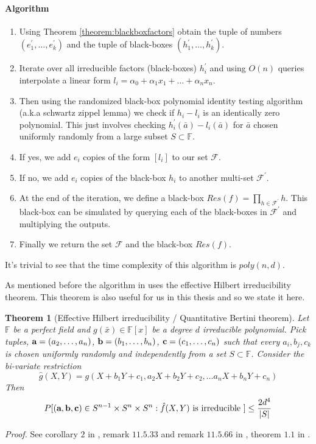 \documentclass[12pt]{caltech_thesis}
\theoremstyle{plain}
\newtheorem{theorem}{Theorem}
\theoremstyle{definition}
\renewcommand{\bf}{\textbf}
\newcommand{\F}{\mathbb{F}}
\newcommand{\MF}{\mathcal{F}}
\newcommand{\B}[1]{\bar{#1}}
\begin{document}
\paragraph{Algorithm} \label{algorithm:blackboxfactors}
\begin{enumerate}
 \item Using Theorem \ref{theorem:blackboxfactors} obtain the tuple of numbers $(e_1^\prime,\ldots,e_k^\prime)$ and the tuple of
 black-boxes $(h_1^\prime,\ldots , h_k^\prime)$.
 \item Iterate over all irreducible factors (black-boxes) $h_i^\prime$ and using $O(n)$ queries interpolate a linear form 
 $l_i = \alpha_0 + \alpha_1x_1 + \ldots + \alpha_n x_n$.
 \item Then using the randomized black-box polynomial identity testing algorithm (a.k.a schwartz zippel lemma) we check if
$h_i-l_i$ is an identically zero polynomial. This just involves checking $h_i^\prime(\B{a}) - l_i(\B{a})$ for $\B{a}$
chosen uniformly randomly from a large subset $S\subset \F$.
\item If yes, we add $e_i$ copies of the form $[l_i]$ to our set $\MF$.
\item  If no, we add $e_i$ copies of the black-box 
$h_i$ to another multi-set $\MF^\prime$.
\item  At the end of the iteration, we define a black-box $Res(f) = \prod\limits_{h\in \MF^\prime}h$.
This black-box can be simulated by querying each of the black-boxes in $\MF^\prime$ and multiplying the outputs.
\item Finally we return the set $\MF$ and the black-box $Res(f)$.
\end{enumerate}

It's trivial to see that the time complexity of this algorithm is $poly(n,d)$.


As mentioned before the algorithm in \cite{KalTr90} uses the effective Hilbert irreducibility theorem. This theorem is also useful
for us in this thesis and so we state it here.
 
\begin{theorem}[Effective Hilbert irreducibility / Quantitative Bertini theorem]\label{theorem:effectivehilbert}
 Let $\F$ be a perfect field and $g(\B{x})\in \F[x]$ be a degree $d$ irreducible polynomial. Pick tuples, ${\bf a} = (a_2,\ldots, a_n)$,  ${\bf b} = (b_1,\ldots,b_n)$, ${\bf c} = (c_1,\ldots,c_n)$
 such that every $a_i,b_j,c_k$ is chosen uniformly randomly and independently from a set $S\subset \F$.
 Consider the bi-variate restriction
\[
\hat{g}(X,Y) = g(X + b_1Y + c_1, a_2X + b_2Y + c_2, \ldots a_nX + b_n Y + c_n)                                                                                              
\]
Then 
\[
 P[ ({\bf a, \bf  b,\bf  c}) \in S^{n-1}\times S^n \times S^n  :  \hat{f}(X,Y) \text{ is irreducible }] \leq \frac{2d^4}{|S|}
\]
\end{theorem}
\emph{Proof.} See corollary $2$ in \cite{Kal91}, remark $11.5.33$ and remark $11.5.66$ in \cite{MulPa13}, theorem $1.1$ in \cite{KSS14}. 
\end{document}

